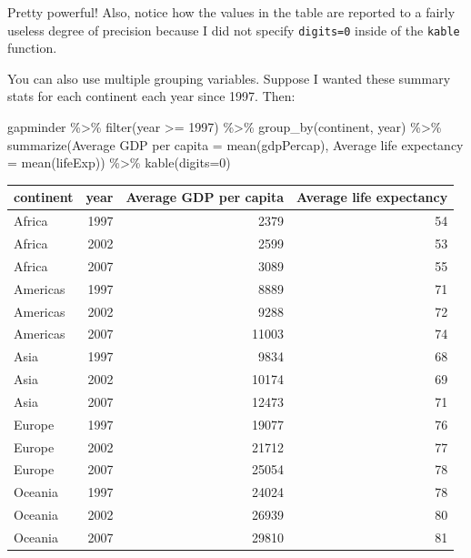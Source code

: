 \documentclass[
]{book}
\makeatletter
\newenvironment{Shaded}{\begin{snugshade}}{\end{snugshade}}
\newcommand{\AttributeTok}[1]{\textcolor[rgb]{0.61,0.61,0.61}{#1}}
\newcommand{\DecValTok}[1]{\textcolor[rgb]{0.06,0.06,0.06}{#1}}
\newcommand{\FunctionTok}[1]{\textcolor[rgb]{0,0,0}{#1}}
\newcommand{\NormalTok}[1]{#1}
\newcommand{\OtherTok}[1]{\textcolor[rgb]{0.37,0.37,0.37}{#1}}
\newcommand{\SpecialCharTok}[1]{\textcolor[rgb]{0,0,0}{#1}}
\newcommand{\StringTok}[1]{\textcolor[rgb]{0.5,0.5,0.5}{#1}}
\newenvironment{kframe}{%
\medskip{}
\setlength{\fboxsep}{.8em}
 \def\at@end@of@kframe{}%
 \ifinner\ifhmode%
  \def\at@end@of@kframe{\end{minipage}}%
  \begin{minipage}{\columnwidth}%
 \fi\fi%
 \def\FrameCommand##1{\hskip\@totalleftmargin \hskip-\fboxsep
 \colorbox{shadecolor}{##1}\hskip-\fboxsep
     \hskip-\linewidth \hskip-\@totalleftmargin \hskip\columnwidth}%
 \MakeFramed {\advance\hsize-\width
   \@totalleftmargin\z@ \linewidth\hsize
   \@setminipage}}%
 {\par\unskip\endMakeFramed%
 \at@end@of@kframe}
\renewenvironment{Shaded}{\begin{kframe}}{\end{kframe}}
\makeatother
\begin{document}
Pretty powerful! Also, notice how the values in the table are reported to a fairly useless degree of precision because I did not specify \texttt{digits=0} inside of the \texttt{kable} function.

You can also use multiple grouping variables. Suppose I wanted these summary stats for each continent each year since 1997. Then:

\begin{Shaded}
\begin{Highlighting}[]
\NormalTok{gapminder }\SpecialCharTok{\%\textgreater{}\%} 
  \FunctionTok{filter}\NormalTok{(year }\SpecialCharTok{\textgreater{}=} \DecValTok{1997}\NormalTok{) }\SpecialCharTok{\%\textgreater{}\%} 
  \FunctionTok{group\_by}\NormalTok{(continent, year) }\SpecialCharTok{\%\textgreater{}\%} 
  \FunctionTok{summarize}\NormalTok{(}\StringTok{\textquotesingle{}Average GDP per capita\textquotesingle{}} \OtherTok{=} \FunctionTok{mean}\NormalTok{(gdpPercap), }
            \StringTok{\textquotesingle{}Average life expectancy\textquotesingle{}} \OtherTok{=} \FunctionTok{mean}\NormalTok{(lifeExp)) }\SpecialCharTok{\%\textgreater{}\%} 
  \FunctionTok{kable}\NormalTok{(}\AttributeTok{digits=}\DecValTok{0}\NormalTok{)}
\end{Highlighting}
\end{Shaded}

\begin{tabular}{l|r|r|r}
\hline
continent & year & Average GDP per capita & Average life expectancy\\
\hline
Africa & 1997 & 2379 & 54\\
\hline
Africa & 2002 & 2599 & 53\\
\hline
Africa & 2007 & 3089 & 55\\
\hline
Americas & 1997 & 8889 & 71\\
\hline
Americas & 2002 & 9288 & 72\\
\hline
Americas & 2007 & 11003 & 74\\
\hline
Asia & 1997 & 9834 & 68\\
\hline
Asia & 2002 & 10174 & 69\\
\hline
Asia & 2007 & 12473 & 71\\
\hline
Europe & 1997 & 19077 & 76\\
\hline
Europe & 2002 & 21712 & 77\\
\hline
Europe & 2007 & 25054 & 78\\
\hline
Oceania & 1997 & 24024 & 78\\
\hline
Oceania & 2002 & 26939 & 80\\
\hline
Oceania & 2007 & 29810 & 81\\
\hline
\end{tabular}
\end{document}
